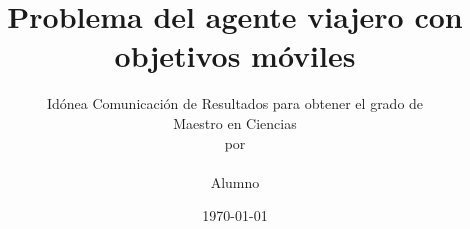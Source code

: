 \documentclass[11pt,titlepage,letterpaper]{book}
\title{\textbf{Problema del agente viajero con objetivos móviles}}
\author{Idónea Comunicación de Resultados para obtener el grado de \\ Maestro en Ciencias\\ por \\\\Alumno}
\date{\today}
\begin{document}
   \def\contentsname{Contenido}
   \def\listfigurename{Lista de Figuras}
  \def\listtablename{Lista de Tablas} 
   \def\bibname{Bibliografía}



\thispagestyle{empty}
\newpage
{}





\tableofcontents
\listoffigures
\listoftables
\listofalgorithms


%
%
%
%







\end{document}
